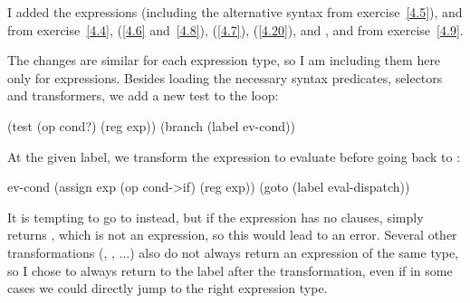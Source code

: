 \begin{exe}[5.23]
    I added the expressions  (including the alternative syntax from 
    exercise~\ref{4.5}),  and  from exercise~\ref{4.4}, 
     (\ref{4.6} and~\ref{4.8}),  (\ref{4.7}),  
    (\ref{4.20}), and ,  and  from 
    exercise~\ref{4.9}.

    The changes are similar for each expression type, so I am including them 
    here only for  expressions. Besides loading the necessary syntax 
    predicates, selectors and transformers, we add a new test to the 
     loop:
    \begin{cscm}
	(test (op cond?) (reg exp))
	(branch (label ev-cond))
    \end{cscm}
    At the given label, we transform the expression to evaluate before going 
    back to :
    \begin{cscm}
    ev-cond
        (assign exp (op cond->if) (reg exp))
        (goto (label eval-dispatch))
    \end{cscm}
    It is tempting to go to  instead, but if the  
    expression has no clauses,  simply returns , 
    which is not an  expression, so this would lead to an error. 
    Several other transformations (, , ...) also do 
    not always return an expression of the same type, so I chose to always 
    return to the  label after the transformation, even if 
    in some cases we could directly jump to the right expression type.
\end{exe}

